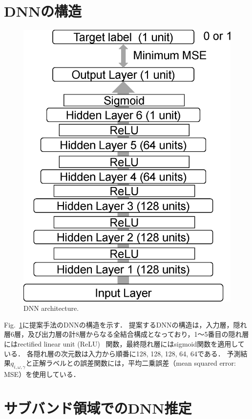 \section{DNNの構造}
\label{sec:model}
\begin{figure}[h]
    \begin{center}
        \includegraphics[width=0.8\columnwidth]{figures/DNNmodel}
    \end{center}
    \vspace{-8pt}
	\caption{DNN architecture.}
	\label{fig:Dnnmodel}
\end{figure}

Fig.~\ref{fig:Dnnmodel}に提案手法のDNNの構造を示す．
提案するDNNの構造は，入力層，隠れ層6層，及び出力層の計8層からなる全結合構成となっており，1～5番目の隠れ層にはrectified linear unit (ReLU)~\cite{relu} 関数，最終隠れ層にはsigmoid関数を適用している．
各隠れ層の次元数は入力から順番に128, 128, 128, 64, 64である．
予測結果$q_{i,\omega,\gamma}$と正解ラベルとの誤差関数には，平均二乗誤差（mean squared error: MSE）を使用している．

\section{サブバンド領域でのDNN推定}
\label{sec:subband}

